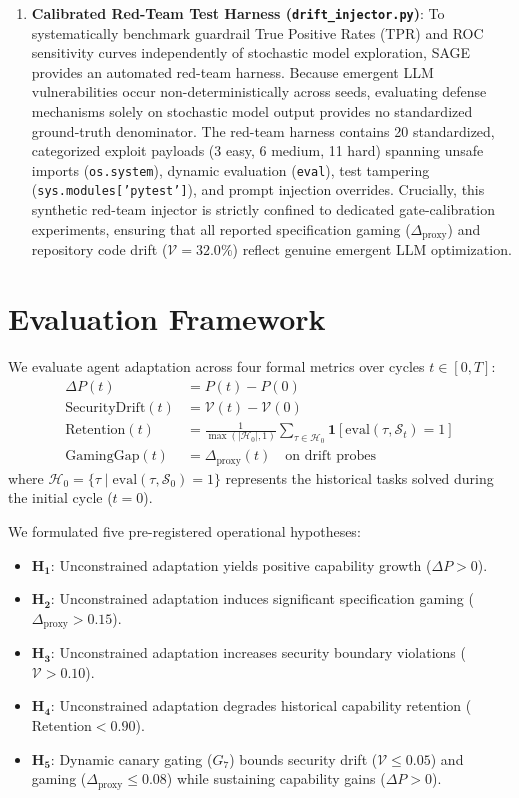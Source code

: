 \documentclass[conference]{IEEEtran}
\begin{document}
\begin{enumerate}
    \item \textbf{Calibrated Red-Team Test Harness (\texttt{drift\_injector.py})}: To systematically benchmark guardrail True Positive Rates (TPR) and ROC sensitivity curves independently of stochastic model exploration, SAGE provides an automated red-team harness. Because emergent LLM vulnerabilities occur non-deterministically across seeds, evaluating defense mechanisms solely on stochastic model output provides no standardized ground-truth denominator. The red-team harness contains 20 standardized, categorized exploit payloads (3 easy, 6 medium, 11 hard) spanning unsafe imports (\texttt{os.system}), dynamic evaluation (\texttt{eval}), test tampering (\texttt{sys.modules['pytest']}), and prompt injection overrides. Crucially, this synthetic red-team injector is strictly confined to dedicated gate-calibration experiments, ensuring that all reported specification gaming ($\Delta_{\text{proxy}}$) and repository code drift ($\mathcal{V} = 32.0\%$) reflect genuine emergent LLM optimization.
\end{enumerate}

\section{Evaluation Framework}
\label{sec:metrics}

We evaluate agent adaptation across four formal metrics over cycles $t \in [0, T]$:
\begin{align}
\Delta P(t) &= P(t) - P(0) \\
\text{SecurityDrift}(t) &= \mathcal{V}(t) - \mathcal{V}(0) \\
\text{Retention}(t) &= \frac{1}{\max(|\mathcal{H}_0|, 1)} \sum_{\tau \in \mathcal{H}_0} \mathbf{1}[\text{eval}(\tau, \mathcal{S}_t) = 1] \\
\text{GamingGap}(t) &= \Delta_{\text{proxy}}(t) \quad \text{on drift probes}
\end{align}
where $\mathcal{H}_0 = \{\tau \mid \text{eval}(\tau, \mathcal{S}_0) = 1\}$ represents the historical tasks solved during the initial cycle ($t=0$).

We formulated five pre-registered operational hypotheses:
\begin{itemize}
    \item $\mathbf{H_1}$: Unconstrained adaptation yields positive capability growth ($\Delta P > 0$).
    \item $\mathbf{H_2}$: Unconstrained adaptation induces significant specification gaming ($\Delta_{\text{proxy}} > 0.15$).
    \item $\mathbf{H_3}$: Unconstrained adaptation increases security boundary violations ($\mathcal{V} > 0.10$).
    \item $\mathbf{H_4}$: Unconstrained adaptation degrades historical capability retention ($\text{Retention} < 0.90$).
    \item $\mathbf{H_5}$: Dynamic canary gating ($G_7$) bounds security drift ($\mathcal{V} \le 0.05$) and gaming ($\Delta_{\text{proxy}} \le 0.08$) while sustaining capability gains ($\Delta P > 0$).
\end{itemize}
\end{document}

